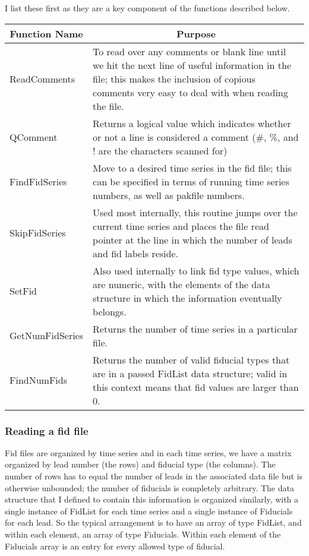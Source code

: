 \documentclass[11pt]{article}
\begin{document}
I list these first as they are a key component of the functions described
below. \\
%
\begin{tabular}{|l|p{4in}|} \hline
\multicolumn{1}{|c|}{Function Name} &
\multicolumn{1}{|c|}{Purpose} \\ \hline
ReadComments & To read over any comments or blank line until we hit the
next line of useful information in the file; this makes the inclusion of
copious comments very easy to deal with when reading the file.\\
QComment & Returns a logical value which indicates whether or not a line is
considered a comment (\#, \%, and ! are the characters scanned for) \\
FindFidSeries & Move to a desired time series in the fid file; this can be
specified in terms of running time series numbers, as well as pakfile
numbers.\\ 
SkipFidSeries & Used most internally, this routine jumps over the current
time series and places the file read pointer at the line in which the number
of leads and fid labels reside. \\
SetFid & Also used internally to link fid type values, which are numeric,
with the elements of the data structure in which the information eventually
belongs. \\
GetNumFidSeries & Returns the number of time series in a particular file.\\
FindNumFids & Returns the number of valid fiducial types that are in a
passed FidList data structure; valid in this context means that fid values
are larger than 0.\\ \hline
\end{tabular}

\subsubsection{Reading a fid file}

Fid files are organized by time series and in each time series, we have a
matrix organized by lead number (the rows) and fiducial type (the
columns).  The number of rows has to equal the number of leads in the
associated data file but is otherwise unbounded;  the number of fiducials
is completely arbitrary.  The data structure that I defined to contain this
information is organized similarly, with a single instance of FidList for
each time series and a single instance of Fiducials for each lead.  So the
typical arrangement is to have an array of type FidList, and within each
element, an array of type Fiducials.  Within each element of the Fiducials
array is an entry for every allowed type of fiducial.
\end{document}
